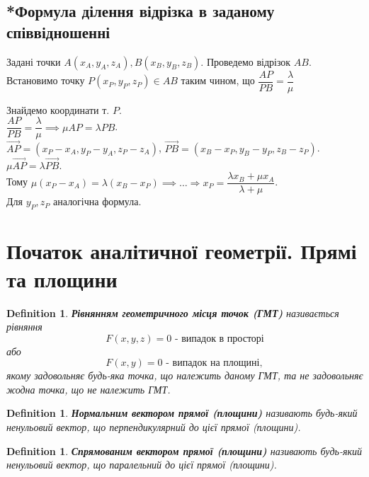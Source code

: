 \documentclass[a4paper, 10pt]{extarticle}
\theoremstyle{theoremdd}
\theoremstyle{theoremdd}
\newtheorem{definition}[theorem]{Definition}
\theoremstyle{theoremdd}
\theoremstyle{theoremdd}
\theoremstyle{theoremdd}
\theoremstyle{theoremdd}
\theoremstyle{theoremdd}
\theoremstyle{theoremdd}
\begin{document}
\subsection{*Формула ділення відрізка в заданому співвідношенні}
Задані точки $A(x_A,y_A,z_A), B(x_B,y_B,z_B)$. Проведемо відрізок $AB$. Встановимо точку $P(x_P,y_P,z_P) \in AB$ таким чином, що $\dfrac{AP}{PB} = \dfrac{\lambda}{\mu}$
\begin{figure}[H]
\centering
{}
\end{figure}
Знайдемо координати т. $P$.\\
$\dfrac{AP}{PB} = \dfrac{\lambda}{\mu} \implies \mu AP = \lambda PB$.\\
$\overrightarrow{AP} = (x_P - x_A, y_P - y_A, z_P - z_A)$, $\overrightarrow{PB} = (x_B - x_P, y_B - y_P, z_B - z_P)$.\\
$\mu \overrightarrow{AP} = \lambda \overrightarrow{PB}$.\\
Тому $\mu (x_P - x_A) = \lambda (x_B - x_P) \implies \dots \Rightarrow x_P = \dfrac{\lambda x_B + \mu x_A}{\lambda + \mu}$.\\
Для $y_P, z_P$ аналогічна формула.
\newpage

\section{Початок аналітичної геометрії. Прямі та площини}
\begin{definition}
\textbf{Рівнянням геометричного місця точок (ГМТ)} називається рівняння $$F(x,y,z) = 0 \text{ - випадок в просторі}$$ або $$F(x,y) = 0 \text{ - випадок на площині},$$ якому задовольняє будь-яка точка, що належить даному ГМТ, та не задовольняє жодна точка, що не належить ГМТ.
\end{definition}

\begin{definition}
\textbf{Нормальним вектором прямої (площини)} називають будь-який ненульовий вектор, що перпендикулярний до цієї прямої (площини).
\end{definition}

\begin{definition}
\textbf{Спрямованим вектором прямої (площини)} називають будь-який ненульовий вектор, що паралельний до цієї прямої (площини).
\end{definition}
\end{document}
